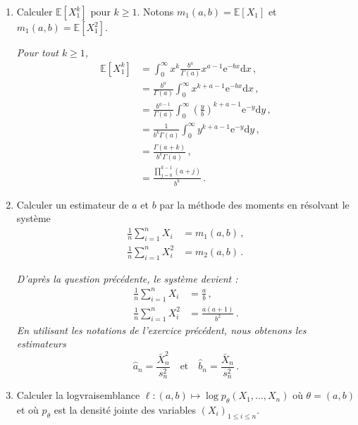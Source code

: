 \documentclass[a4paper,10pt,fleqn]{article}
\newcommand{\1}{\ensuremath{\mathbbm{1}}}
\begin{document}
\begin{enumerate}
\item Calculer $\mathbb{E}[X_1^k]$ pour $k\geq 1$. Notons $m_1(a,b) = \mathbb{E}[X_1]$ et $m_1(a,b) = \mathbb{E}[X^2_1]$.

\vspace{.2cm}

{\em Pour tout $k\geq 1$,
\begin{align*}
\mathbb{E}[X_1^k] &= \int_0^\infty x^k \frac{b^a}{\Gamma(a)}x^{a-1}\mathrm{e}^{-b x} \mathrm{d} x\,,\\
&= \frac{b^a}{\Gamma(a)}\int_0^\infty x^{k+a-1}\mathrm{e}^{-b x} \mathrm{d} x\,,\\
&= \frac{b^{a-1}}{\Gamma(a)}\int_0^\infty \left(\frac{y}{b}\right)^{k+a-1}\mathrm{e}^{-y} \mathrm{d} y\,,\\
&= \frac{1}{b^k\Gamma(a)}\int_0^\infty y^{k+a-1}\mathrm{e}^{-y} \mathrm{d} y\,,\\
&= \frac{\Gamma(a+k)}{b^k\Gamma(a)}\,,\\
&= \frac{\prod_{j=0}^{k-1}(a+j)}{b^k}\,.
\end{align*}}

 \item Calculer un estimateur de $a$ et $b$ par la m\'ethode des moments en r\'esolvant le syst\`eme
\begin{align*}
\frac{1}{n}\sum_{i=1}^nX_i &= m_1(a,b) \,,\\
\frac{1}{n}\sum_{i=1}^nX^2_i &= m_2(a,b) \,.
\end{align*}

\vspace{.2cm}

{\em D'apr\`es la question pr\'ec\'edente, le syst\`eme devient :
\begin{align*}
\frac{1}{n}\sum_{i=1}^nX_i &= \frac{a}{b}\,,\\
\frac{1}{n}\sum_{i=1}^nX^2_i &= \frac{a(a+1)}{b^2} \,.
\end{align*}
En utilisant les notations de l'exercice pr\'ec\'edent, nous obtenons les estimateurs 
$$
\widehat{a}_n = \frac{\bar X_n^2}{s_n^2}\quad\mathrm{et}\quad \widehat{b}_n = \frac{\bar X_n}{s_n^2}\,.
$$
}

\item Calculer la logvraisemblance $\ell : (a,b) \mapsto \log p_\theta (X_1,\ldots,X_n)$ o\`u $\theta = (a,b)$ et o\`u $p_\theta$ est la densit\'e jointe des variables $(X_i)_{1\leq i \leq n}$.

\vspace{.2cm}


\end{enumerate}
\end{document}
